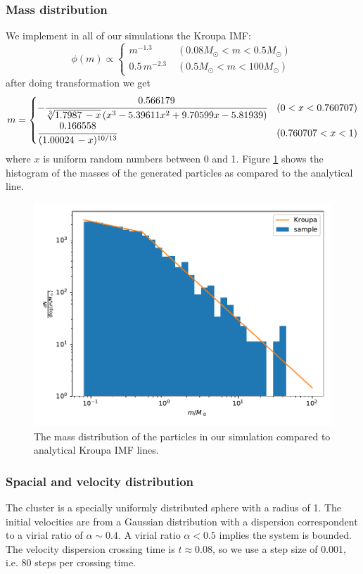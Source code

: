 \subsubsection*{Mass distribution}
We implement in all of our simulations the Kroupa IMF:
\begin{equation}
\phi(m) \propto 
\begin{cases}
m^{-1.3} \; &(0.08M_\odot < m < 0.5M_\odot) \\
0.5 \, m^{-2.3} \; &(0.5M_\odot<m<100M_\odot)
\end{cases}
\end{equation}
after doing transformation we get
\begin{equation}
m=
	\begin{cases}
	-\cfrac{0.566179}{\sqrt[3]{1.7987\, - x} \left(x^3-5.39611 
	x^2+9.70599 x-5.81939\right)} & (0<x<0.760707)\\
	\cfrac{0.166558}{(1.00024\, -x)^{10/13}} & (0.760707<x<1)
	\end{cases}
\end{equation}
where $ x $ is uniform random numbers between 0 and 1. Figure \ref{fig:imf} shows the 
histogram of the masses of the generated particles as compared to the analytical line.
\begin{figure}
	\centering
	\includegraphics[width=.6\columnwidth]{../simulations/imf.pdf}
	\caption{The mass distribution of the particles in our simulation compared to analytical 
	Kroupa IMF lines.}
	\label{fig:imf}
\end{figure}

\subsubsection*{Spacial and velocity distribution}
The cluster is a specially uniformly distributed sphere with a radius of 1. The initial 
velocities are from a  Gaussian distribution with a dispersion correspondent to a virial ratio 
of $ \alpha \sim 0.4 $. A virial ratio $ \alpha < 0.5 $ implies the system is bounded. The 
velocity dispersion crossing time is $ t \approx 0.08 $, so we use a step size of 0.001, i.e. 
80 steps per crossing time.

